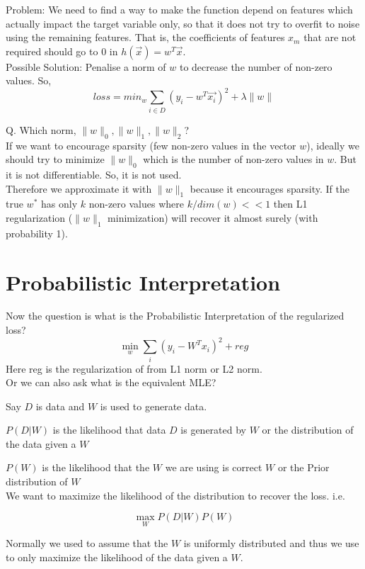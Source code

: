 \documentclass[11pt, twosides]{article}
\begin{document}
Problem: We need to find a way to make the function depend on features which actually impact the target variable only, so that it does not try to overfit to noise using the remaining features. That is, the coefficients of features $x_m$ that are not required should go to $0$ in $h(\overrightarrow{x}) = w^T\overrightarrow{x}$.\\
Possible Solution: Penalise a norm of $w$ to decrease the number of non-zero values. So, $$loss = min_w \sum_{i \in D} (y_i-w^T\overrightarrow{x_i})^2 + \lambda \|w\|$$
\begin{flushleft}
Q. Which norm, $\|w\|_0, \|w\|_1, \|w\|_2$?\\
\color{blue}
If we want to encourage sparsity (few non-zero values in the vector $w$), ideally we should try to minimize $\|w\|_0$ which is the number of non-zero values in $w$. But it is not differentiable. So, it is not used.\\
Therefore we approximate it with $\|w\|_1$ because it encourages sparsity. If the true $w^*$ has only $k$ non-zero values where $k/dim(w) << 1$ then L1 regularization ($\|w\|_1$ minimization) will recover it almost surely (with probability 1).
\end{flushleft}


\section{Probabilistic Interpretation}

Now the question is what is the Probabilistic Interpretation of the regularized loss?
$$\min_w \sum_i (y_i - W^Tx_i)^2 + reg$$
Here reg is the regularization of from L1 norm or L2 norm.\\

Or we can also ask what is the equivalent MLE?

Say $D$ is data and $W$ is used to generate data.

$P(D|W)$ is the likelihood that data $D$ is generated by $W$ or the distribution of the data given a $W$

$P(W)$ is the likelihood that the $W$ we are using is correct $W$ or the Prior distribution of $W$\\


We want to maximize the likelihood of the distribution to recover the loss. i.e.

$$\max_W P(D|W)P(W)$$

Normally we used to assume that the $W$ is uniformly distributed and thus we use to only maximize the likelihood of the data given a $W$.
\end{document}
